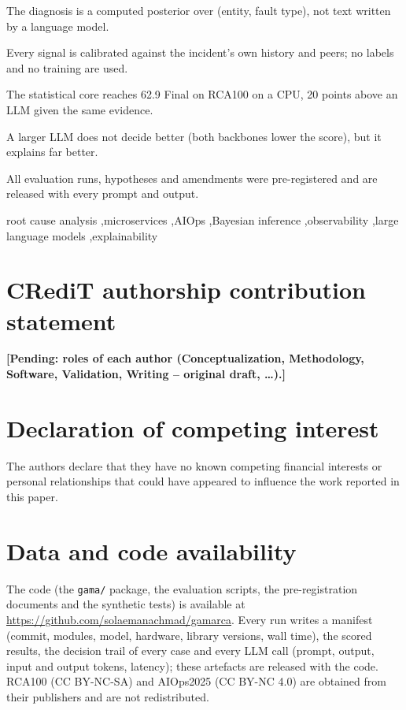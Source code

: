 \documentclass[preprint,12pt]{elsarticle}
\newcommand{\pending}[1]{\textcolor{pend}{\textbf{[Pending: #1]}}}
\begin{document}
\begin{frontmatter}
\begin{highlights}
\item The diagnosis is a computed posterior over (entity, fault type), not text written by a language model.
\item Every signal is calibrated against the incident's own history and peers; no labels and no training are used.
\item The statistical core reaches 62.9 Final on RCA100 on a CPU, 20 points above an LLM given the same evidence.
\item A larger LLM does not decide better (both backbones lower the score), but it explains far better.
\item All evaluation runs, hypotheses and amendments were pre-registered and are released with every prompt and output.
\end{highlights}

\begin{keyword}
root cause analysis \sep microservices \sep AIOps \sep Bayesian inference \sep observability \sep large language models
\sep explainability
\end{keyword}

\end{frontmatter}
\linenumbers










\section*{CRediT authorship contribution statement}
\pending{roles of each author (Conceptualization, Methodology, Software, Validation, Writing -- original draft, \ldots).}

\section*{Declaration of competing interest}
The authors declare that they have no known competing financial interests or personal relationships that could have appeared to
influence the work reported in this paper.

\section*{Data and code availability}
The code (the \texttt{gama/} package, the evaluation scripts, the pre-registration documents and the synthetic tests) is available
at \url{https://github.com/solaemanachmad/gamarca}. Every run writes a manifest (commit, modules, model, hardware, library versions,
wall time), the scored results, the decision trail of every case and every LLM call (prompt, output, input and output tokens,
latency); these artefacts are released with the code. RCA100 (CC BY-NC-SA) and AIOps2025 (CC BY-NC 4.0) are obtained from their
publishers and are not redistributed.
\end{document}
